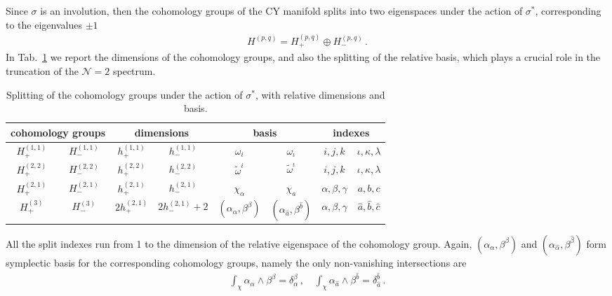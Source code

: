 \documentclass[12pt,a4paper]{book}
\begin{document}
Since $\sigma$ is an involution, then the cohomology groups of the CY manifold splits into two eigenspaces under the action of $\sigma^*$, corresponding to the eigenvalues $\pm 1$
\begin{align}
\label{eq:SplitCohomologyGroups}
H^{(p,q)} = H^{(p,q)}_+ \oplus H^{(p,q)}_- \,.
\end{align}
In Tab.~\ref{tab:SplitCohomologyGroups} we report the dimensions of the cohomology groups, and also the splitting of the relative basis, which plays a crucial role in the truncation of the $\mathcal{N} = 2$ spectrum.\\
\begin{small}
\begin{table}
\begin{center}
\begin{tabular}{|c|c||c|c||c|c||c|c|}
\hline
\multicolumn{2}{|c||}{cohomology groups} & \multicolumn{2}{c||}{dimensions} & \multicolumn{2}{c||}{basis} & \multicolumn{2}{c|}{indexes}\\
\hline
$H^{(1,1)}_+$ & $H^{(1,1)}_-$ & $h^{(1,1)}_+$ & $h^{(1,1)}_-$ & $\omega_i$ & $\omega_\iota$ & $i, j, k$ & $\iota, \kappa, \lambda$ \\
\hline
$H^{(2,2)}_+$ & $H^{(2,2)}_-$ & $h^{(2,2)}_+$ & $h^{(2,2)}_-$ & $\tilde{\omega}^i$ & $\tilde{\omega}^\iota$ & $i, j, k$ & $\iota, \kappa, \lambda$ \\
\hline
$H^{(2,1)}_+$ & $H^{(2,1)}_-$ & $h^{(2,1)}_+$ & $h^{(2,1)}_-$ & $\chi_\alpha$ & $\chi_a$ & $\alpha, \beta, \gamma$ & $a, b, c$ \\
\hline
$H^{(3)}_+$ & $H^{(3)}_-$ & $2 h^{(2,1)}_+$ & $2 h^{(2,1)}_- + 2$ & $(\alpha_\alpha, \beta^{\beta})$ & $(\alpha_{\hat{a}}, \beta^{\hat{b}})$ & $\alpha, \beta, \gamma$ & $\hat{a}, \hat{b}, \hat{c}$ \\
\hline
\end{tabular} 
\caption{\label{tab:SplitCohomologyGroups} Splitting of the cohomology groups under the action of $\sigma^*$, with relative dimensions and basis.}
\end{center}
\end{table}
\end{small}

All the split indexes run from 1 to the dimension of the relative eigenspace of the cohomology group. Again, $(\alpha_\alpha, \beta^{\beta})$ and $(\alpha_{\hat{\alpha}}, \beta^{\hat{\beta}})$ form symplectic basis for the corresponding cohomology groups, namely the only non-vanishing intersections are
\begin{align}
\label{eq:OrientifoldedSymplecticBasis}
\int_\chi \alpha_\alpha \wedge \beta^\beta = \delta_\alpha^\beta \,, \quad \int_\chi \alpha_{\hat{a}} \wedge \beta^{\hat{b}} = \delta_{\hat{a}}^{\hat{b}}\,.
\end{align}
\end{document}
